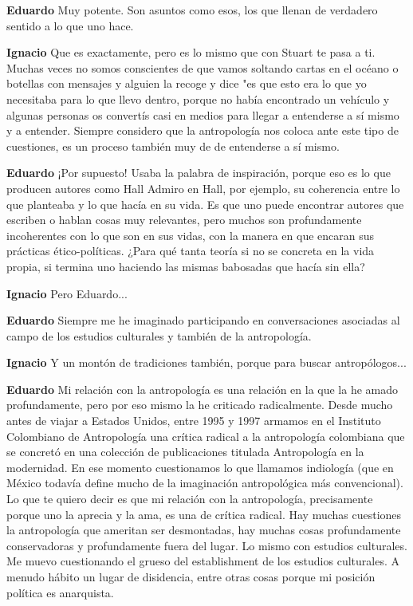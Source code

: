 \documentclass[
  spanish,
  11pt,
  a4paper,
]{scrbook}
\newenvironment{transcripcion}{
    \begin{list}{}{
        \setlength{\leftmargin}{1.5em}  %
        \setlength{\rightmargin}{0em}
        \setlength{\itemsep}{0.2em}     %
        \setlength{\parsep}{0.0em}
        \setlength{\listparindent}{0pt}
    }
}{
    \end{list}
}
\newcommand{\personaje}[1]{\textbf{#1}\quad}
\begin{document}
\begin{transcripcion}
\item \personaje{Eduardo} Muy potente. Son asuntos como esos, los que llenan de verdadero sentido a lo que uno hace.

\item \personaje{Ignacio} Que es exactamente, pero es lo mismo que con Stuart te pasa a ti. Muchas veces no somos conscientes de que vamos soltando cartas en el océano o botellas con mensajes y alguien la recoge y dice "es que esto era lo que yo necesitaba para lo que llevo dentro, porque no había encontrado un vehículo y algunas personas os convertís casi en medios para llegar a entenderse a sí mismo y a entender. Siempre considero que la antropología nos coloca ante este tipo de cuestiones, es un proceso también muy de de entenderse a sí mismo.

\item \personaje{Eduardo} ¡Por supuesto! Usaba la palabra de inspiración, porque eso es lo que producen autores como Hall Admiro en Hall, por ejemplo, su coherencia entre lo que planteaba y lo que hacía en su vida. Es que uno puede encontrar autores que escriben o hablan cosas muy relevantes, pero muchos son profundamente incoherentes con lo que son en sus vidas, con la manera en que encaran sus prácticas ético-políticas. ¿Para qué tanta teoría si no se concreta en la vida propia, si termina uno haciendo las mismas babosadas que hacía sin ella?

\item \personaje{Ignacio} Pero Eduardo...

\item \personaje{Eduardo} Siempre me he imaginado participando en conversaciones asociadas al campo de los estudios culturales y también de la antropología.

\item \personaje{Ignacio} Y un montón de tradiciones también, porque para buscar antropólogos...

\item \personaje{Eduardo} Mi relación con la antropología es una relación en la que la he amado profundamente, pero por eso mismo la he criticado radicalmente. Desde mucho antes de viajar a Estados Unidos, entre 1995 y 1997 armamos en el Instituto Colombiano de Antropología una crítica radical a la antropología colombiana que se concretó en una colección de publicaciones titulada Antropología en la modernidad. En ese momento cuestionamos lo que llamamos indiología (que en México todavía define mucho de la imaginación antropológica más convencional). Lo que te quiero decir es que mi relación con la antropología, precisamente porque uno la aprecia y la ama, es una de crítica radical. Hay muchas cuestiones la antropología que ameritan ser desmontadas, hay muchas cosas profundamente conservadoras y profundamente fuera del lugar. Lo mismo con estudios culturales. Me muevo cuestionando el grueso del establishment de los estudios culturales. A menudo hábito un lugar de disidencia, entre otras cosas porque mi posición política es anarquista.


\end{transcripcion}
\end{document}
